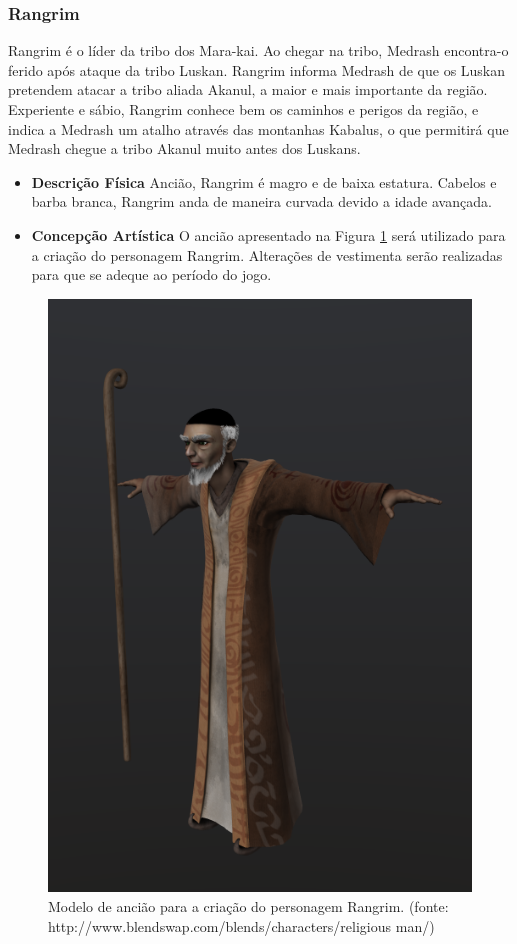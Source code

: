 \subsubsection{Rangrim}
Rangrim é o líder da tribo dos Mara-kai. Ao chegar na tribo, Medrash
 encontra-o ferido após ataque da tribo Luskan. Rangrim informa Medrash de
 que os Luskan pretendem atacar a tribo aliada Akanul, a maior e mais
 importante da região. Experiente e sábio, Rangrim conhece bem os caminhos
 e perigos da região, e indica a Medrash um atalho através das montanhas
 Kabalus, o que permitirá que Medrash chegue a tribo Akanul muito antes dos
 Luskans.
\begin{itemize}
\item {\bf Descrição Física}
Ancião, Rangrim é magro e de baixa estatura. Cabelos e barba branca,
 Rangrim anda de maneira curvada devido a idade avançada.
\item {\bf Concepção Artística}
O ancião apresentado na Figura \ref{img:rangrim} será utilizado para a criação
 do personagem Rangrim. Alterações de vestimenta serão realizadas para que
 se adeque ao período do jogo.

\end{itemize}
\begin{figure}[H]
 \centering
 \includegraphics[scale=0.5]{Imagens/rangrim01.png}
 \caption{Modelo de ancião para a criação do personagem Rangrim. (fonte: http://www.blendswap.com/blends/characters/religious man/)}
\label{img:rangrim}
\end{figure}

